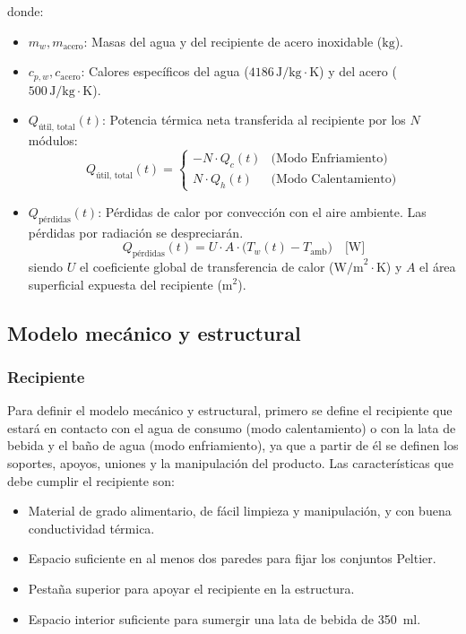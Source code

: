 \documentclass[12pt, a4paper]{article}
\begin{document}
donde:
\begin{itemize}
    \item $m_w, m_{\text{acero}}$: Masas del agua y del recipiente de acero inoxidable ($\text{kg}$).
    \item $c_{p,w}, c_{\text{acero}}$: Calores específicos del agua ($4186\,\text{J/kg}\cdot\text{K}$) y del acero ($500\,\text{J/kg}\cdot\text{K}$).
    \item $Q_{\text{útil, total}}(t)$: Potencia térmica neta transferida al recipiente por los $N$ módulos:
    \begin{equation}
        Q_{\text{útil, total}}(t) = 
        \begin{cases}
            - N \cdot Q_c(t) & \text{(Modo Enfriamiento)} \\
            N \cdot Q_h(t) & \text{(Modo Calentamiento)}
        \end{cases}
    \end{equation}
    \item $Q_{\text{pérdidas}}(t)$: Pérdidas de calor por convección con el aire ambiente. Las pérdidas por radiación se despreciarán.
    \begin{equation}
        Q_{\text{pérdidas}}(t) = U \cdot A \cdot \big(T_w(t) - T_{\text{amb}}\big) \quad \text{[W]}
    \end{equation}
    siendo $U$ el coeficiente global de transferencia de calor ($\text{W/m}^2\cdot\text{K}$) y $A$ el área superficial expuesta del recipiente ($\text{m}^2$).
\end{itemize}




\subsection{Modelo mecánico y estructural}
\label{sec:modelo_mecanico}

\subsubsection{Recipiente}

Para definir el modelo mecánico y estructural, primero se define el recipiente que estará en contacto con el agua de consumo (modo calentamiento) o con la lata de bebida y el baño de agua (modo enfriamiento), ya que a partir de él se definen los soportes, apoyos, uniones y la manipulación del producto. Las características que debe cumplir el recipiente son:

\begin{itemize}
    \item Material de grado alimentario, de fácil limpieza y manipulación, y con buena conductividad térmica.
    \item Espacio suficiente en al menos dos paredes para fijar los conjuntos Peltier.
    \item Pestaña superior para apoyar el recipiente en la estructura.
    \item Espacio interior suficiente para sumergir una lata de bebida de \SI{350}{\ml}.
\end{itemize}
\end{document}
